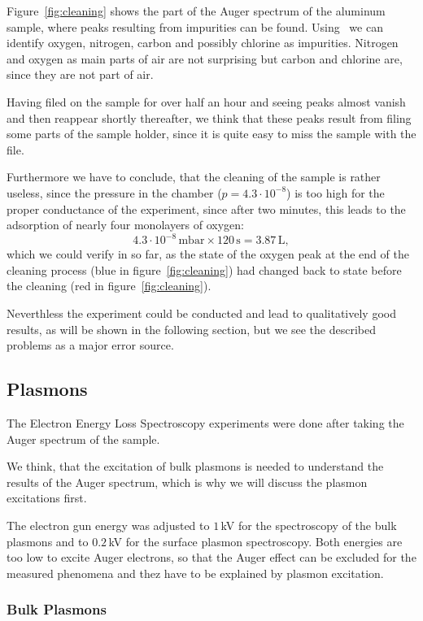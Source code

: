 \documentclass[a4paper,10pt]{scrartcl}
\begin{document}
Figure~\ref{fig:cleaning} shows the part of the Auger spectrum of the aluminum sample, where peaks resulting from impurities can be found. Using~\cite{handbook} we can identify oxygen, nitrogen, carbon and possibly chlorine as impurities. Nitrogen and oxygen as main parts of air are not surprising but carbon and chlorine are, since they are not part of air.

Having filed on the sample for over half an hour and seeing  peaks almost vanish and then reappear shortly thereafter, we think that these peaks result from filing some parts of the sample holder, since it is quite easy to miss the sample with the file.

Furthermore we have to conclude, that the cleaning of the sample is rather useless, since the pressure in the chamber ($p = 4.3 \cdot 10^{-8}$) is too high for the proper conductance of the experiment, since after two minutes, this leads to the adsorption of nearly four monolayers of oxygen:
\begin{equation}
4.3 \cdot 10^{-8}\,\mbox{mbar} \times 120\,\mbox{s} = 3.87\,\mbox{L},
\end{equation} 
which we could verify in so far, as the state of the oxygen peak at the end of the cleaning process (blue in figure~\ref{fig:cleaning}) had changed back to state before the cleaning (red in figure~\ref{fig:cleaning}).

Neverthless the experiment could be conducted and lead to qualitatively good results, as will be shown in the following section, but we see the described problems as a major error source.

\subsection{Plasmons}

The Electron Energy Loss Spectroscopy experiments were done after taking the Auger spectrum of the sample. 

We think, that the excitation of bulk plasmons is needed to understand the results of the Auger spectrum, which is why we will discuss the plasmon excitations first.

The electron gun energy was adjusted to $1\,$kV for the spectroscopy of the bulk plasmons and to $0.2\,$kV for the surface plasmon spectroscopy. Both energies are too low to excite Auger electrons, so that the Auger effect can be excluded for the measured phenomena and thez have to be explained by plasmon excitation.

\subsubsection{Bulk Plasmons}
\end{document}
